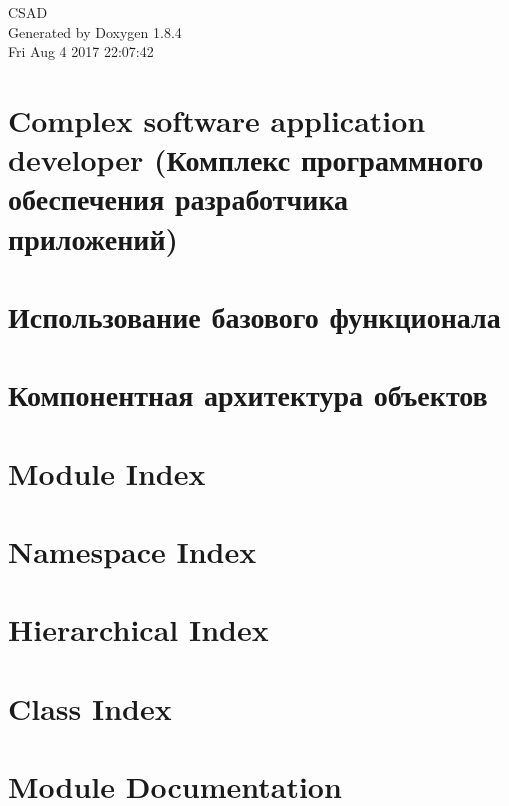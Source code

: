 \documentclass[twoside]{book}
\newcommand{\clearemptydoublepage}{%
  \newpage{\pagestyle{empty}\cleardoublepage}%
}
\begin{document}
\hypersetup{pageanchor=false}
\begin{titlepage}
\vspace*{7cm}
\begin{center}%
{\Large C\-S\-A\-D }\\
\vspace*{1cm}
{\large Generated by Doxygen 1.8.4}\\
\vspace*{0.5cm}
{\small Fri Aug 4 2017 22:07:42}\\
\end{center}
\end{titlepage}
\clearemptydoublepage
\tableofcontents
\clearemptydoublepage
{}
\hypersetup{pageanchor=true}

\chapter{Complex software application developer (Комплекс программного обеспечения разработчика приложений)}
\label{index}\hypertarget{index}{}
\chapter{Использование базового функционала}
\label{page2}
\hypertarget{page2}{}

\chapter{Компонентная архитектура объектов}
\label{page1}
\hypertarget{page1}{}

\chapter{Module Index}

\chapter{Namespace Index}

\chapter{Hierarchical Index}

\chapter{Class Index}

\chapter{Module Documentation}










\end{document}
